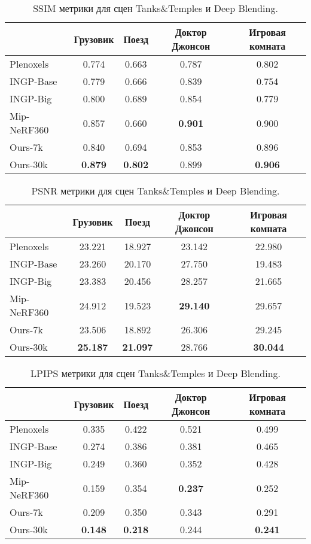 \begin{appendix}
\begin{table}[H]
{\begin{tabular}{l|ccccc|cccc}
\end{tabular}
    }
\end{table}
    \begin{table}[H]
    \caption{SSIM метрики для сцен Tanks\&Temples и Deep Blending. }
        \centering
    \begin{tabular}{l|cc|cc}
    ~ & Грузовик & Поезд & Доктор Джонсон & Игровая комната \\ \hline
    Plenoxels & 0.774 & 0.663 & 0.787 & 0.802 \\ 
    INGP-Base & 0.779 & 0.666 & 0.839 & 0.754 \\ 
    INGP-Big & 0.800 & 0.689 & 0.854 & 0.779 \\ 
    Mip-NeRF360 & 0.857 & 0.660 & \textbf{0.901} & 0.900 \\ 
    Ours-7k & 0.840 & 0.694 & 0.853 & 0.896 \\ 
    Ours-30k & \textbf{0.879} & \textbf{0.802} & 0.899 & \textbf{0.906} \\ 
\end{tabular}
\end{table}
    \begin{table}[H]
    \caption{PSNR метрики для сцен Tanks\&Temples и Deep Blending. }
        \centering
        \begin{tabular}{l|cc|cc}
            ~ & Грузовик & Поезд & Доктор Джонсон & Игровая комната \\ \hline
            Plenoxels & 23.221 & 18.927 & 23.142 & 22.980 \\ 
            INGP-Base & 23.260  & 20.170 & 27.750 & 19.483 \\ 
            INGP-Big & 23.383  & 20.456 & 28.257 & 21.665 \\ 
            Mip-NeRF360 & 24.912  & 19.523 & \textbf{29.140} & 29.657 \\ 
            Ours-7k & 23.506  & 18.892 & 26.306 & 29.245 \\ 
            Ours-30k & \textbf{25.187} & \textbf{21.097} & 28.766 & \textbf{30.044} \\ 
        \end{tabular}
\end{table}
    \begin{table}[H]
    \caption{LPIPS метрики для сцен Tanks\&Temples и Deep Blending. }
        \centering
    \begin{tabular}{l|cc|cc}
    ~ & Грузовик & Поезд & Доктор Джонсон & Игровая комната \\ \hline
    Plenoxels & 0.335 & 0.422 & 0.521 & 0.499 \\ 
    INGP-Base & 0.274 & 0.386 & 0.381 & 0.465 \\ 
    INGP-Big & 0.249 & 0.360 & 0.352 & 0.428 \\ 
    Mip-NeRF360 & 0.159 & 0.354 & \textbf{0.237} & 0.252 \\ 
    Ours-7k & 0.209 & 0.350 & 0.343 & 0.291 \\ 
    Ours-30k & \textbf{0.148} & \textbf{0.218} & 0.244 & \textbf{0.241} \\ 
\end{tabular}
        \label{tab:ttdb_scene_lpips}
\end{table}
\end{appendix}
